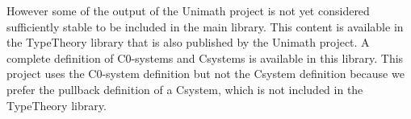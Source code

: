 However some of the output of the Unimath project is not yet considered
sufficiently stable to be included in the main library. This content is
available in the TypeTheory library that is also published by the Unimath
project. A complete definition of C0-systems and Csystems is available in this
library. This project uses the C0-system definition but not the Csystem
definition because we prefer the pullback definition of a Csystem, which is not
included in the TypeTheory library.